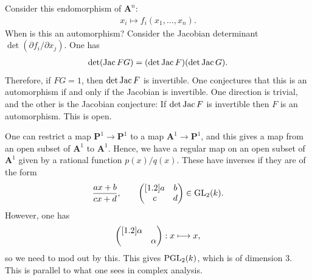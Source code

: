 \documentclass[11pt, oneside,margin=1in]{article}
\begin{document}
\begin{example}\label{}\text{}
Consider this endomorphism of $\mathbf{A}^n$:
\begin{align*}
	x_i\longmapsto f_i(x_1,\hdots, x_n).
\end{align*}
When is this an automorphism? Consider the Jacobian determinant $\det (\partial f_i/\partial x_j)$. One has
\begin{align*}
	\det (\operatorname{Jac} FG) =  (\det \operatorname{Jac} F) (\det \operatorname{Jac} G).
\end{align*}
Therefore, if $FG = 1$, then $\det\operatorname{Jac} F$ is invertible. One conjectures that this is an automorphism if and only if the Jacobian is invertible. One direction is trivial, and the other is the Jacobian conjecture: If $\det \operatorname{Jac} F$ is invertible then $F$ is an automorphism. This is open.
\end{example}

\begin{example}\label{}\text{}
One can restrict a map $\mathbf{P}^1\longrightarrow \mathbf{P}^1$ to a map $\mathbf{A}^1\longrightarrow \mathbf{P}^1$, and this gives a map from an open subset of $\mathbf{A}^1$ to $\mathbf{A}^1$. Hence, we have a regular map on an open subset of $\mathbf{A}^1$ given by a rational function $p(x)/q (x)$. These have inverses if they are of the form
\begin{align*}
	\frac{ax+b}{cx+d},\qquad \begin{pmatrix} [ 1.2 ] a&b\\c&d\end{pmatrix}\in \operatorname{GL}_{2}(k).
\end{align*}
However, one has
\[
\begin{pmatrix} [ 1.2 ] \alpha\\&\alpha\end{pmatrix} : x\longmapsto x,
\]
so we need to mod out by this. This gives $\operatorname{PGL}_2( k)$, which is of dimension $3$. This is parallel to what one sees in complex analysis.
\end{example}
\end{document}
